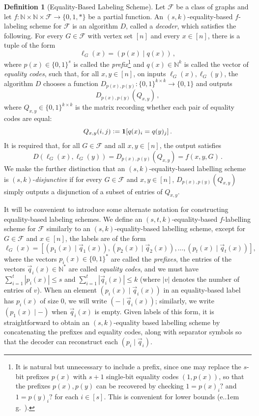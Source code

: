 \documentclass[11pt]{article}
\newcommand*\eg{e.\kern.1em g.\ }
\theoremstyle{definition}
\newtheorem{definition}{Definition}
\newcommand{\zo}{\{0,1\}}
\newcommand{\define}{\vcentcolon=}
\renewcommand{\leq}{\leqslant}
\def\F {{\mathcal F}}
\def\bN{{\mathbb N}}
\newcommand{\ind}[1]{\mathbf{1}[ #1 ]}
\begin{document}
\begin{definition}[Equality-Based Labeling Scheme]
Let $\F$ be a class of graphs and let $f : \bN \times \bN \times \F \to \{0,1,*\}$ be a partial
function. An $(s,k)$-equality-based $f$-labeling scheme for $\F$ is an algorithm $D$, called a
\emph{decoder}, which satisfies the following. For every $G \in \F$ with vertex set $[n]$ and every
$x \in [n]$, there is a tuple of the form
\[
  \ell_G(x) = (p(x) \mid q(x)) \,,
\]
where $p(x) \in \zo^s$ is called the \emph{prefix}\footnote{It is natural but unnecessary to include
a prefix, since one may replace the $s$-bit prefixes $p(x)$ with $s+1$ single-bit equality codes
$(1, p(x))$, so that the prefixes $p(x), p(y)$ can be recovered by checking $1 = p(x)_i?$ and $1 =
p(y)_i?$ for each $i \in [s]$. This is convenient for lower bounds (\eg \cite{CLV19,HWZ21}).} and
$q(x) \in \bN^k$ is called the vector of \emph{equality codes}, such that, for all $x,y \in [n]$, on
inputs $\ell_G(x), \ell_G(y)$, the algorithm $D$ chooses a function $D_{p(x), p(y)} : \zo^{k \times
k} \to \zo$ and outputs
\[
  D_{p(x), p(y)}(Q_{x,y}) \,,
\]
where $Q_{x,y} \in \zo^{k \times k}$ is the matrix recording whether each pair of equality codes are
equal:
\[
  Q_{x,y}(i,j) \define \ind{q(x)_i = q(y)_j} \,.
\]
It is required that, for all $G \in \F$ and all $x,y \in [n]$, the output satisfies
\[
  D(\ell_G(x), \ell_G(y)) = D_{p(x), p(y)}(Q_{x,y}) = f(x,y,G) \,.
\]
We make the further distinction that an $(s,k)$-equality-based labelling scheme is
$(s,k)$-\emph{disjunctive} if for every $G \in \F$ and $x,y \in [n]$, $D_{p(x),p(y)}(Q_{x,y})$
simply outputs a disjunction of a subset of entries of $Q_{x,y}$.
\end{definition}
It will be convenient to introduce some alternate notation for constructing equality-based labeling
schemes. We define an $(s,t,k)$-equality-based $f$-labelling scheme for $\F$ similarly to an
$(s,k)$-equality-based labelling scheme, except for $G \in \F$ and $x \in [n]$, the labels are of
the form
\[
  \ell_G(x)
    = \left[
      (p_1(x) \mid \vec q_1(x)), (p_2(x) \mid \vec q_2(x)), \dotsc, (p_t(x) \mid \vec q_t(x))
      \right],
\]
where the vectors $p_i(x) \in \zo^*$ are called the \emph{prefixes}, the entries of the vectors
$\vec q_i(x) \in \bN^*$ are called \emph{equality codes}, and we must have $\sum_{i=1}^t |p_i(x)|
\leq s$ and $\sum_{i=1}^t |\vec q_i(x)| \leq k$ (where $|v|$ denotes the number of entries of $v$).
When an element $(p_i(x) \mid \vec q_i(x))$ in an equality-based label has $p_i(x)$ of size 0, we
will write $(- \mid \vec q_i(x))$; similarly, we write $(p_1(x) \mid - )$ when $\vec q_i(x)$ is
empty.  Given labels of this form, it is straightforward to obtain an $(s,k)$-equality based
labelling scheme by concatenating the prefixes and equality codes, along with separator symbols so
that the decoder can reconstruct each $(p_i \mid \vec q_i)$.
\end{document}
